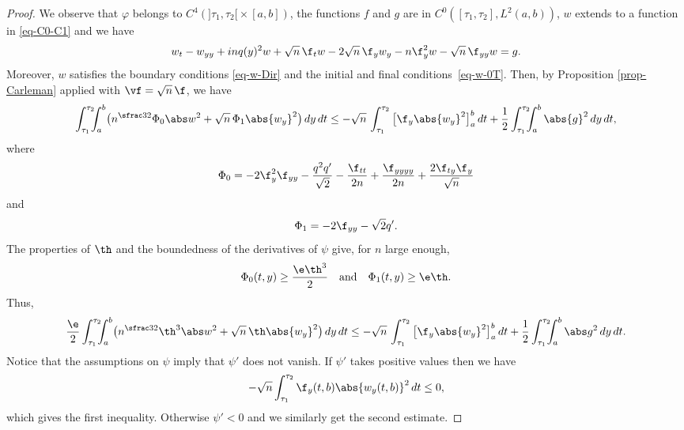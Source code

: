 \begin{proof}
We observe that $\varphi$ belongs to $C^4(]\tau_1,\tau_2[{}\times [a,b])$, the functions $f$ and $g$ are in $C^0([\tau_1,\tau_2], L^2(a,b))$, $w$ extends to a function in \eqref{eq-C0-C1} and we have
\begin{equation*}
w_t - w_{yy} + inq(y)^2 w + \sqrt n\,\f_t w - 2 \sqrt n\,\f_y w_y - n \f_y^2 w - \sqrt n\,\f_{yy} w = g.
\end{equation*}
Moreover, $w$ satisfies the boundary conditions \eqref{eq-w-Dir} and the initial and final conditions~\eqref{eq-w-0T}. Then, by Proposition \ref{prop-Carleman} applied with $\vf = \sqrt n\,\f$, we have
\[
\int_{\tau_1}^{\tau_2}\hspace*{-2mm} \int_a^b \bigl(n^{\sfrac 32} \Phi_0 \abs w^2 + \sqrt n\,\Phi_1 \abs{w_y}^2 \bigr) \, dy \, dt
\leq - \sqrt n\,\int_{\tau_1}^{\tau_2} \big[ \f_y \abs{w_y}^2 \big]_a^b \, dt + \frac 1 2 \int_{\tau_1}^{\tau_2}\hspace*{-2mm} \int_a^b \abs{g}^2 \, dy \, dt ,
\]
where
\begin{equation*}
\Phi_0 = - 2 \f_y^2 \f_{yy} - \frac {q^2 q'}{\sqrt 2} - \frac {\f_{tt}}{2n} + \frac {\f_{yyyy}}{2n} + \frac {2\f_{ty} \f_{y}}{\sqrt n}
\end{equation*}
and
\begin{equation*}
\Phi_1 = - 2 \f_{yy} - \sqrt 2 q'.
\end{equation*}
The properties of $\th$ and the boundedness of the derivatives of $\psi$ give, for $n$ large enough,
\[
\Phi_0(t,y) \geq \frac {\e \th^3} 2 \quad \text{and} \quad \Phi_1(t,y) \geq \e \th.
\]
Thus,
\[
\frac \e 2 \int_{\tau_1}^{\tau_2}\hspace*{-2mm} \int_a^b \bigl(n^{\sfrac 32} \th^3 \abs w^2 + \sqrt n\,\th \abs{w_y}^2 \bigr) \, dy \, dt
\leq - \sqrt n\,\int_{\tau_1}^{\tau_2} \big[ \f_y \abs{w_y}^2 \big]_a^b \, dt + \frac 12 \int_{\tau_1}^{\tau_2}\hspace*{-2mm} \int_a^b \abs g^2 \, dy \, dt.
\]
Notice that the assumptions on $\psi$ imply that $\psi'$ does not vanish. If $\psi'$ takes positive values then we have
\[
- \sqrt n \int_{\tau_1}^{\tau_2} \f_y(t,b) \abs{w_y(t,b)}^2 \, dt \leq 0,
\]
which gives the first inequality. Otherwise $\psi' < 0$ and we similarly get the second estimate.
\end{proof}

 \label{sec-observability-fin}


